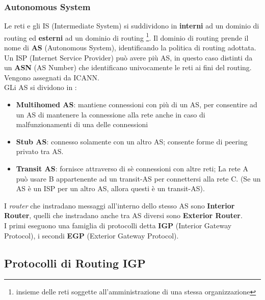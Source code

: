 \documentclass[a4paper,11pt]{article}
\begin{document}
\subsubsection{Autonomous System}
Le reti e gli IS (Intermediate System) si suddividono in \textbf{interni} ad un dominio di routing ed \textbf{esterni} ad un dominio di routing \footnote{insieme delle reti soggette all'amministrazione di una stessa organizzazione}. Il dominio di routing prende il nome di \textbf{AS} (Autonomous System), identificando la politica di routing adottata.\\
Un ISP (Internet Service Provider) può avere più AS, in questo caso distinti da un \textbf{ASN} (AS Number) che identificano univocamente le reti ai fini del routing. Vengono assegnati da ICANN.\\
GLi AS si dividono in :
\begin{itemize}
\item \textbf{Multihomed AS}: mantiene connessioni con più di un AS, per consentire ad un AS di mantenere la connessione alla rete anche in caso di malfunzionamenti di una delle connessioni
\item\textbf{Stub AS}: connesso solamente con un altro AS; consente forme di peering privato tra AS.
\item\textbf{Transit AS}: fornisce attraverso di sè connessioni con altre reti; La rete A può usare B appartenente ad un transit-AS per connettersi alla rete C. (Se un AS è un ISP per un altro AS, allora questi è un transit-AS).
\end{itemize}
I \textit{router} che instradano messaggi all'interno dello stesso AS sono \textbf{Interior Router}, quelli che instradano anche tra AS diversi sono \textbf{Exterior Router}.\\
I primi eseguono una famiglia di protocolli detta \textbf{IGP} (Interior Gateway Protocol), i secondi \textbf{EGP} (Exterior Gateway Protocol).
\newpage

\subsection{Protocolli di Routing IGP} 
\end{document}
